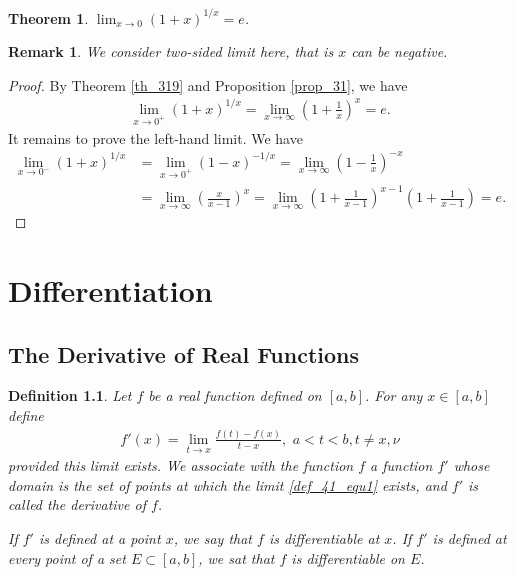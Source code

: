 \documentclass[11pt]{book}
\newtheorem{definition}{Definition}[chapter]
\newtheorem{theorem}{Theorem}[chapter]
\newtheorem{remark}{Remark}[chapter]
\theoremstyle{definition}
\numberwithin{equation}{chapter}
\begin{document}
\medskip

\begin{theorem}
$\lim_{x\to 0} \left(1 + x\right)^{1/x} = e$.
\end{theorem}

\begin{remark}
We consider two-sided limit here, that is $x$ can be negative.
\end{remark}

\begin{proof}
By Theorem \ref{th_319} and Proposition \ref{prop_31}, we have
\begin{align*}
    \lim_{x\to 0^+} \left(1 + x\right)^{1/x} = \lim_{x \to \infty} \left(1 + \frac{1}{x}\right)^{x} = e.
\end{align*}
It remains to prove the left-hand limit. We have
\begin{align*}
    \lim_{x\to 0^-} \left(1 + x\right)^{1/x} & = \lim_{x\to 0^+} \left(1 - x\right)^{-1/x} = \lim_{x\to \infty} \left(1 - \frac{1}{x}\right)^{-x} \\
    & = \lim_{x\to \infty} \left(\frac{x}{x-1}\right)^x = \lim_{x\to \infty} \left(1 + \frac{1}{x-1}\right)^{x-1} \left(1 + \frac{1}{x-1}\right) = e.
\end{align*}
\end{proof}








\chapter{Differentiation}

\section{The Derivative of Real Functions}

\begin{definition}\label{def_41}
Let $f$ be a real function defined on $[a,b]$. For any $x \in [a,b]$ define 
\begin{align}\label{def_41_equ1}
    f'(x) = \lim_{t \to x} \frac{f(t) - f(x)}{t - x}, \,\, a < t < b, t \neq x, \nu
\end{align}
provided this limit exists. We associate with the function $f$ a function $f'$ whose domain is the set of points at which the limit \eqref{def_41_equ1} exists, and $f'$ is called the derivative of $f$.

If $f'$ is defined at a point $x$, we say that $f$ is differentiable at $x$. If $f'$ is defined at every point of a set $E \subset [a,b]$, we sat that $f$ is differentiable on $E$.
\end{definition}
\end{document}
